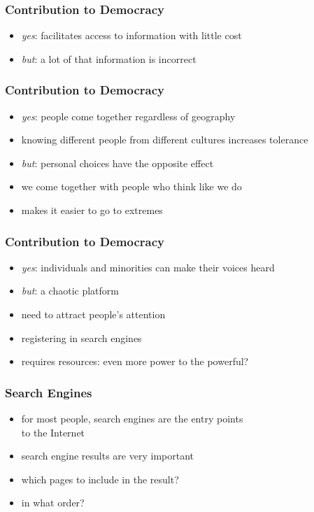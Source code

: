 \documentclass[dvipsnames]{beamer}
\theoremstyle{plain}
\begin{document}
\begin{frame}
  \frametitle{Contribution to Democracy}

  \begin{itemize}
    \item \emph{yes}: facilitates access to information with little cost

    \medskip
    \item \emph{but}: a lot of that information is incorrect
  \end{itemize}
\end{frame}

\begin{frame}
  \frametitle{Contribution to Democracy}

  \begin{itemize}
    \item \emph{yes}: people come together regardless of geography
    \item knowing different people from different cultures increases tolerance

    \medskip
    \item \emph{but}: personal choices have the opposite effect
    \item we come together with people who think like we do
    \item makes it easier to go to extremes
  \end{itemize}
\end{frame}

\begin{frame}
  \frametitle{Contribution to Democracy}

  \begin{itemize}
    \item \emph{yes}: individuals and minorities can make their voices heard

    \medskip
    \item \emph{but}: a chaotic platform
    \item need to attract people's attention
    \item registering in search engines
    \item requires resources: even more power to the powerful?
  \end{itemize}
\end{frame}

\begin{frame}
  \frametitle{Search Engines}

  \begin{itemize}
    \item for most people, search engines are the entry points\\
      to the Internet

    \medskip
    \item search engine results are very important
    \item which pages to include in the result?
    \item in what order?
  \end{itemize}
\end{frame}
\end{document}
